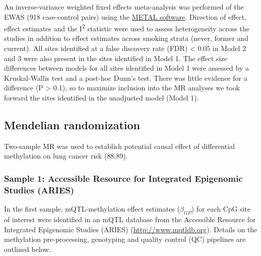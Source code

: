 \documentclass[11pt,twoside]{bristolthesis}
\begin{document}
An inverse-variance weighted fixed effects meta-analysis was performed of the EWAS (918 case-control pairs) using the \href{http://csg.sph.umich.edu/abecasis/metal/}{METAL software}. Direction of effect, effect estimates and the I\textsuperscript{2} statistic were used to assess heterogeneity across the studies in addition to effect estimates across smoking strata (never, former and current). All sites identified at a false discovery rate (FDR) \textless{} 0.05 in Model 2 and 3 were also present in the sites identified in Model 1. The effect size differences between models for all sites identified in Model 1 were assessed by a Kruskal-Wallis test and a post-hoc Dunn's test. There was little evidence for a difference (P \textgreater{} 0.1), so to maximize inclusion into the MR analyses we took forward the sites identified in the unadjusted model (Model 1).

\hypertarget{mendelian-randomization-1}{%
\subsection{Mendelian randomization}\label{mendelian-randomization-1}}

Two-sample MR was used to establish potential causal effect of differential methylation on lung cancer risk (88,89).

\hypertarget{sample-1-accessible-resource-for-integrated-epigenomic-studies-aries}{%
\subsubsection{Sample 1: Accessible Resource for Integrated Epigenomic Studies (ARIES)}\label{sample-1-accessible-resource-for-integrated-epigenomic-studies-aries}}

In the first sample, mQTL-methylation effect estimates (\(\beta_{GP}\)) for each CpG site of interest were identified in an mQTL database from the Accessible Resource for Integrated Epigenomic Studies (ARIES) (\url{http://www.mqtldb.org}). Details on the methylation pre-processing, genotyping and quality control (QC) pipelines are outlined below.
\end{document}
